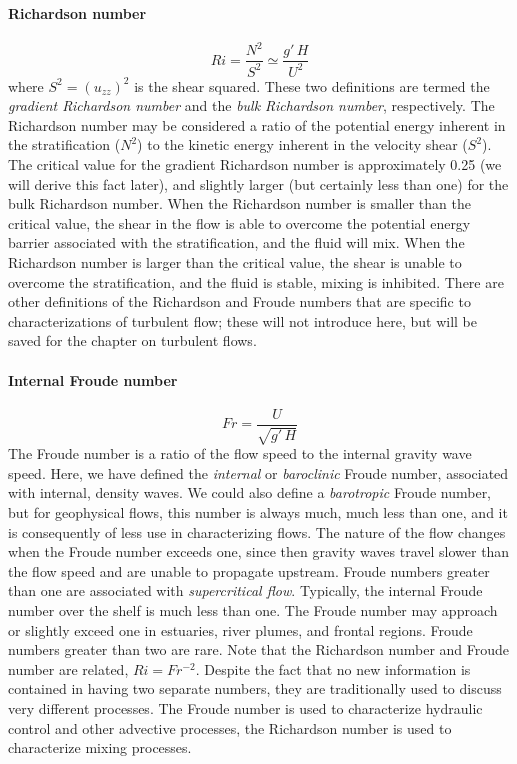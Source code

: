 \documentclass[11pt]{report}
\numberwithin{equation}{section}
\begin{document}
\paragraph{Richardson number} 
\begin{equation}
    Ri = \frac{N^2}{S^2} \simeq \frac{g'\,H}{U^2}
\end{equation}
where $S^2 = (u_{zz})^2$ is the shear squared.  These two definitions are termed the {\it gradient Richardson number} and the {\it bulk Richardson number}, respectively.  The Richardson number may be considered a ratio of the potential energy inherent in the stratification ($N^2$) to the kinetic energy inherent in the velocity shear ($S^2$).  The critical value for the gradient Richardson number is approximately 0.25 (we will derive this fact later), and slightly larger (but certainly less than one) for the bulk Richardson number.  When the Richardson number is smaller than the critical value, the shear in the flow is able to overcome the potential energy barrier associated with the stratification, and the fluid will mix.  When the Richardson number is larger than the critical value, the shear is unable to overcome the stratification, and the fluid is stable, mixing is inhibited.  There are other definitions of the Richardson and Froude numbers that are specific to characterizations of turbulent flow; these will not introduce here, but will be saved for the chapter on turbulent flows.

\paragraph{Internal Froude number} 
\begin{equation}
    Fr = \frac{U}{\sqrt{g'\,H}}
\end{equation}
The Froude number is a ratio of the flow speed to the internal gravity wave speed.  Here, we have defined the {\it internal} or {\it baroclinic} Froude number, associated with internal, density waves.  We could also define a {\it barotropic} Froude number, but for geophysical flows, this number is always much, much less than one, and it is consequently of less use in characterizing flows.  The nature of the flow changes when the Froude number exceeds one, since then gravity waves travel slower than the flow speed and are unable to propagate upstream.  Froude numbers greater than one are associated with {\it supercritical flow}.  Typically, the internal Froude number over the shelf is much less than one.  The Froude number may approach or slightly exceed one in estuaries, river plumes, and frontal regions.  Froude numbers greater than two are rare.  Note that the Richardson number and Froude number are related, $Ri = Fr^{-2}$.  Despite the fact that no new information is contained in having two separate numbers, they are traditionally used to discuss very different processes.  The Froude number is used to characterize hydraulic control and other advective processes, the Richardson number is used to characterize mixing processes.
\end{document}
